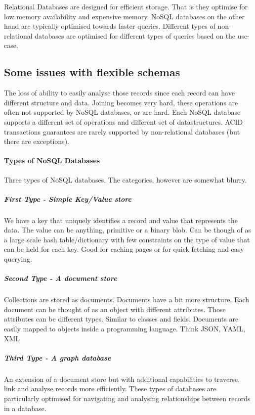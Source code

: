 \documentclass[a4paper, 11pt]{book}
\begin{document}
    Relational Databases are designed for efficient storage.
    That is they optimise for low memory availability and expensive memory.
    NoSQL databases on the other hand are typically optimised towards faster queries.
    Different types of non-relational databases are optimised for different types of queries based on the use-case.

    \subsection{Some issues with flexible schemas}
    The loss of ability to easily analyse those records since each record can have different structure and data.
    Joining becomes very hard, these operations are often not supported by NoSQL databases, or are hard.
    Each NoSQL database supports a different set of operations and different set of datastructures.
    ACID transactions guarantees are rarely supported by non-relational databases (but there are exceptions).

    \paragraph{Types of NoSQL Databases}
    Three types of NoSQL databases.
    The categories, however are somewhat blurry.

    \subparagraph{First Type - Simple Key/Value store}
    We have a key that uniquely identifies a record and value that represents the data.
    The value can be anything, primitive or a binary blob.
    Can be though of as a large scale hash table/dictionary with few constraints on the type of value that can be held for each key.
    Good for caching pages or for quick fetching and easy querying.

    \subparagraph{Second Type - A document store }
    Collections are stored as documents.
    Documents have a bit more structure.
    Each document can be thought of as an object with different attributes.
    Those attributes can be different types.
    Similar to classes and fields.
    Documents are easily mapped to objects inside a programming language.
    Think JSON, YAML, XML

    \subparagraph{Third Type - A graph database}
    An extension of a document store but with additional capabilities to traverse, link and analyse records more efficiently.
    These types of databases are particularly optimised for navigating and analysing relationships between records in a database.
\end{document}
